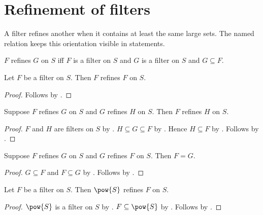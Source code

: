 \section{Refinement of filters}



A filter refines another when it contains at least the same large sets.  The
named relation keeps this orientation visible in statements.

\begin{definition}\label{filter_refines}
    $F$ refines $G$ on $S$ iff
        $F$ is a filter on $S$ and $G$ is a filter on $S$ and $G\subseteq F$.
\end{definition}

\begin{proposition}\label{filter_refines_reflexive}
    Let $F$ be a filter on $S$.
    Then $F$ refines $F$ on $S$.
\end{proposition}
\begin{proof}
    Follows by .
\end{proof}

\begin{proposition}\label{filter_refines_transitive}
    Suppose $F$ refines $G$ on $S$ and $G$ refines $H$ on $S$.
    Then $F$ refines $H$ on $S$.
\end{proposition}
\begin{proof}
    $F$ and $H$ are filters on $S$ by .
    $H\subseteq G\subseteq F$ by .
    Hence $H\subseteq F$ by .
    Follows by .
\end{proof}

\begin{proposition}\label{filter_refines_antisymmetric}
    Suppose $F$ refines $G$ on $S$ and $G$ refines $F$ on $S$.
    Then $F=G$.
\end{proposition}
\begin{proof}
    $G\subseteq F$ and $F\subseteq G$ by .
    Follows by .
\end{proof}

\begin{proposition}\label{improper_filter_refines_every_filter}
    Let $F$ be a filter on $S$.
    Then $\pow{S}$ refines $F$ on $S$.
\end{proposition}
\begin{proof}
    $\pow{S}$ is a filter on $S$ by .
    $F\subseteq\pow{S}$ by .
    Follows by .
\end{proof}

